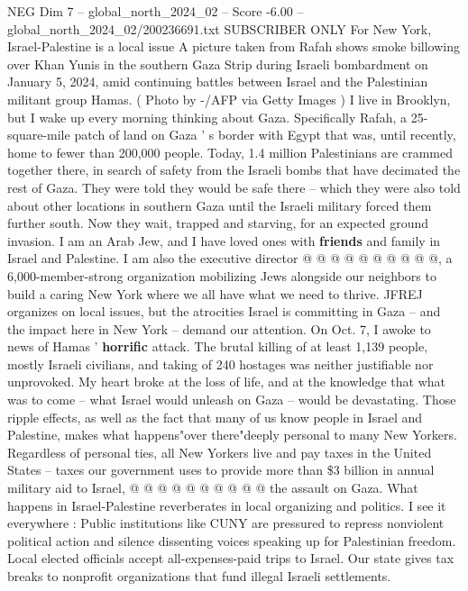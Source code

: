 \begin{textsample}{NEG Dim 7 – global\_north\_2024\_02 – Score -6.00 – global\_north\_2024\_02/200236691.txt}  \label{ex:f7_neg_284}
SUBSCRIBER ONLY For New York, Israel-Palestine is a local issue A picture taken from Rafah shows smoke billowing over Khan Yunis in the southern Gaza Strip during Israeli bombardment on January 5, 2024, amid continuing battles between Israel and the Palestinian militant group Hamas. ( Photo by -/AFP via Getty Images ) I live in Brooklyn, but I wake up every morning thinking about Gaza.
Specifically Rafah, a 25-square-mile patch of land on Gaza ' s border with Egypt that was, until recently, home to fewer than 200,000 people.
Today, 1.4 million Palestinians are crammed together there, in search of safety from the Israeli bombs that have decimated the rest of Gaza.
They were told they would be safe there -- which they were also told about other locations in southern Gaza until the Israeli military forced them further south.
Now they wait, trapped and starving, for an expected ground invasion.
I am an Arab Jew, and I have loved ones with \textbf{friends} and family in Israel and Palestine.
I am also the executive director @ @ @ @ @ @ @ @ @ @, a 6,000-member-strong organization mobilizing Jews alongside our neighbors to build a caring New York where we all have what we need to thrive.
JFREJ organizes on local issues, but the atrocities Israel is committing in Gaza -- and the impact here in New York -- demand our attention.
On Oct. 7, I awoke to news of Hamas ' \textbf{horrific} attack.
The brutal killing of at least 1,139 people, mostly Israeli civilians, and taking of 240 hostages was neither justifiable nor unprovoked.
My heart broke at the loss of life, and at the knowledge that what was to come -- what Israel would unleash on Gaza -- would be devastating.
Those ripple effects, as well as the fact that many of us know people in Israel and Palestine, makes what happens"over there"deeply personal to many New Yorkers.
Regardless of personal ties, all New Yorkers live and pay taxes in the United States -- taxes our government uses to provide more than \$3 billion in annual military aid to Israel, @ @ @ @ @ @ @ @ @ @ the assault on Gaza.
What happens in Israel-Palestine reverberates in local organizing and politics.
I see it everywhere : Public institutions like CUNY are pressured to repress nonviolent political action and silence dissenting voices speaking up for Palestinian freedom.
Local elected officials accept all-expenses-paid trips to Israel.
Our state gives tax breaks to nonprofit organizations that fund illegal Israeli settlements.

\end{textsample}
